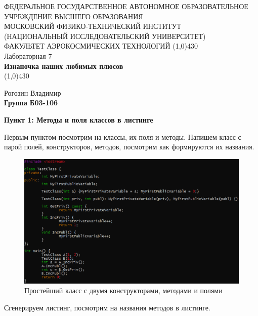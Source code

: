 \documentclass[a4paper,12pt]{article}
\begin{document}
\begin{titlepage}
\begin{center}
\large{\small ФЕДЕРАЛЬНОЕ ГОСУДАРСТВЕННОЕ АВТОНОМНОЕ ОБРАЗОВАТЕЛЬНОЕ\\ УЧРЕЖДЕНИЕ ВЫСШЕГО ОБРАЗОВАНИЯ \\ МОСКОВСКИЙ ФИЗИКО-ТЕХНИЧЕСКИЙ ИНСТИТУТ\\ (НАЦИОНАЛЬНЫЙ ИССЛЕДОВАТЕЛЬСКИЙ УНИВЕРСИТЕТ)\\ ФАКУЛЬТЕТ АЭРОКОСМИЧЕСКИХ ТЕХНОЛОГИЙ}
\vfill
\line(1,0){430}\\[1mm]
\huge{Лабораторная 7}\\
\huge\textbf{Изнаночка наших любимых плюсов}\\
\line(1,0){430}\\[1mm]
\vfill
\begin{flushright}
\normalsize{Рогозин Владимир}\\
\normalsize{\textbf{Группа Б03-106}}\\
\end{flushright}
\end{center}
\end{titlepage}

\textbf{Пункт 1: Методы и поля классов в листинге}

Первым пунктом посмотрим на классы, их поля и методы. Напишем класс с парой полей, конструкторов, методов, посмотрим как формируются их названия. 
\begin{figure}[H]\label{fig: Код генерация названий}
    \centering
    \includegraphics[width = \textwidth]{Код генерация названий.png}
    \caption{Простейший класс с двумя конструкторами, методами и полями}
\end{figure}
Сгенерируем листинг, посмотрим на названия методов в листинге.
\end{document}
